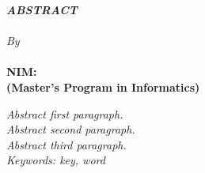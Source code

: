 \clearpage
{}

\begin{spacing}{1}
\begin{center}
  \textbf{\large \MakeUppercase{\emph{Abstract}}} \\[2em]

  \textbf{\large \MakeUppercase{\emph{\TitleEnglish}}} \\[2em]

  \normalsize \normalfont \textit{By}\\
  \large \bfseries \AuthorName\\
  NIM:~\uppercase{\AuthorNIM}\\
  (Master's Program in Informatics)\\[3em]
\end{center}

\emph{Abstract first paragraph.}\\

\emph{Abstract second paragraph.}\\

\emph{Abstract third paragraph.}\\

\noindent \emph{Keywords: key, word}
\end{spacing}